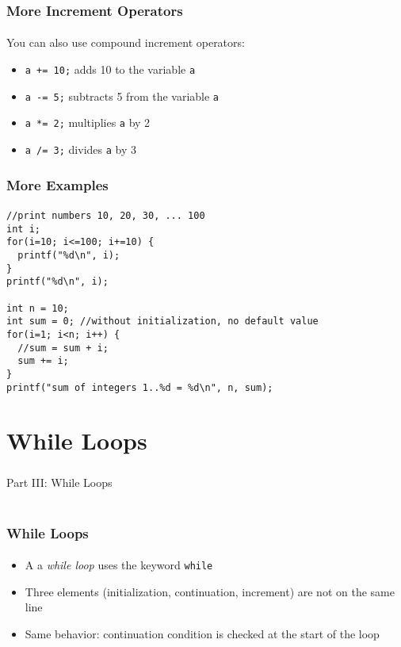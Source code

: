 \documentclass[]{beamer}
\begin{document}
\begin{frame}[fragile]
  \frametitle{More Increment Operators}
  \framesubtitle{}

You can also use compound increment operators:
\begin{itemize}[<+(1)->]
  \item \texttt{a += 10;} adds 10 to the variable \texttt{a}
  \item \texttt{a -= 5;} subtracts 5 from the variable \texttt{a}
  \item \texttt{a *= 2;} multiplies \texttt{a} by 2
  \item \texttt{a /= 3;} divides \texttt{a} by 3
\end{itemize}
  
\end{frame}


\begin{frame}[fragile]
  \frametitle{More Examples}
  \framesubtitle{}
  
\begin{verbatim}
//print numbers 10, 20, 30, ... 100
int i;
for(i=10; i<=100; i+=10) {
  printf("%d\n", i);
}
printf("%d\n", i); 

int n = 10;
int sum = 0; //without initialization, no default value
for(i=1; i<n; i++) {
  //sum = sum + i;
  sum += i;
}
printf("sum of integers 1..%d = %d\n", n, sum);
\end{verbatim}

\end{frame}

\section{While Loops}

\begin{frame}
    \frametitle{}
    \framesubtitle{}
    
    \begin{center}
    {\Huge Part III: While Loops}\\
    {\Large ~}
    \end{center}

\end{frame}


\begin{frame}
  \frametitle{While Loops}
  \framesubtitle{}

\begin{itemize}[<+->]
  \item A a \emph{while loop} uses the keyword \texttt{while} 
  \item Three elements (initialization, continuation, increment) are not on the same line
  \item Same behavior: continuation condition is checked at the start of the loop
\end{itemize}

\end{frame}
\end{document}
